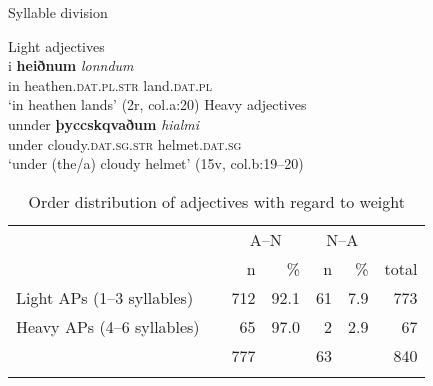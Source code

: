 \documentclass[output=paper,colorlinks,citecolor=brown]{langscibook}
\begin{document}
\begin{exe}
\ex\label{ch8ex25}Syllable division
\begin{xlist}
\ex\label{ch8ex25a}Light adjectives\\
\gll i \textbf{heiðnum} \textit{lonndum} \\
in heathen.\textsc{dat.pl.str} land.\textsc{dat.pl}\\
\glt `in heathen lands' (2r, col.a:20)
\ex\label{ch8ex25b}Heavy adjectives\\
\gll unnder \textbf{þyccskqvaðum} \textit{hialmi} \\
under cloudy.\textsc{dat.sg.str} helmet.\textsc{dat.sg}\\
\glt `under (the/a) cloudy helmet' (15v, col.b:19--20)
\end{xlist}
\end{exe}

 

\begin{table}[t]
\caption{Order distribution of adjectives with regard to weight}\label{ch8t5}

\begin{tabular}{l rr  rr r}
\lsptoprule
& \multicolumn{2}{c}{A--N} & \multicolumn{2}{c}{N--A}\\
\cmidrule(lr){2-3}\cmidrule(lr){4-5}
                             &  n  & \%   &  n  & \% & total\\
\midrule
  Light APs (1--3 syllables) & 712 & 92.1 & 61 & 7.9 & 773\\
  Heavy APs (4--6 syllables)~~ & 65  & 97.0 & 2  & 2.9 & 67\\
  \midrule
                             & 777 &      & 63 &     & 840\\
\lspbottomrule
\end{tabular}

\end{table}
\end{document}
